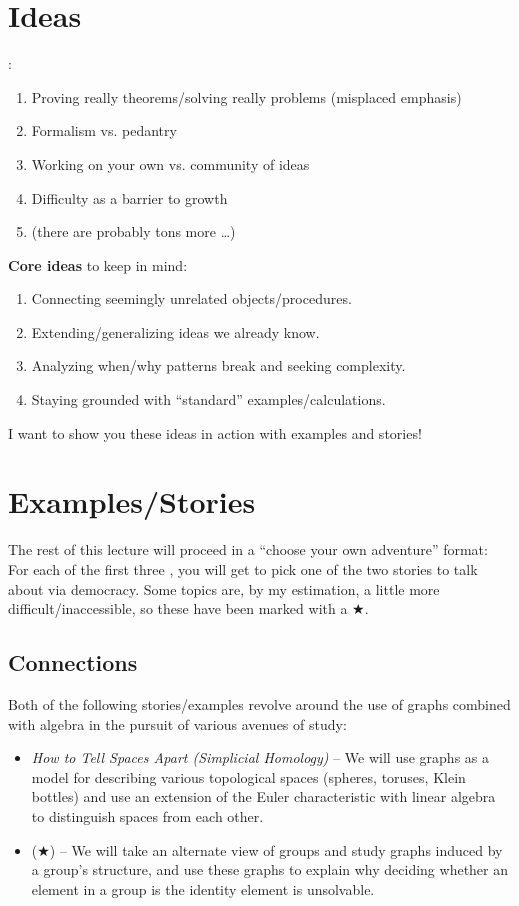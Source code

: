 \documentclass[12pt]{article}
\begin{document}
\section{Ideas}
: 
\begin{enumerate}[label=(\alph*)]
  \item Proving really  theorems/solving really  problems
    (misplaced emphasis) 
  \item Formalism vs. pedantry
  \item Working on your own vs. community of ideas
  \item Difficulty as a barrier to growth
  \item (there are probably tons more \dots)  
\end{enumerate}
\textbf{Core ideas} to keep in mind: 
\begin{enumerate}[label=(\arabic*)]
  \item Connecting seemingly unrelated objects/procedures.  
  \item Extending/generalizing ideas we already know. 
  \item Analyzing when/why patterns break and seeking complexity.
  \item Staying grounded with ``standard'' examples/calculations. 
\end{enumerate}
 I want to show you these ideas in action with examples and stories!  
\section{Examples/Stories}
The rest of this lecture will proceed in a ``choose your own adventure'' format:
For each of the first three , you will get to pick one of the
two stories to talk about via democracy. Some topics are, by my estimation, a
little more difficult/inaccessible, so these have been marked with a $\bigstar$. 

\subsection{Connections}
Both of the following stories/examples revolve around the use of graphs combined
with algebra in the pursuit of various avenues of study:
\begin{itemize}
  \item \textit{How to Tell Spaces Apart (Simplicial Homology)} --
    We will use graphs as a model for describing various topological spaces
    (spheres, toruses, Klein bottles) and use an extension of the Euler
    characteristic with linear algebra to distinguish spaces from each other. 
  \item ($\bigstar$)  -- We
    will take an alternate view of groups and study graphs induced by a group's
    structure, and use these graphs to explain why deciding whether an element
    in a group is the identity element is unsolvable. 
\end{itemize}
\end{document}
